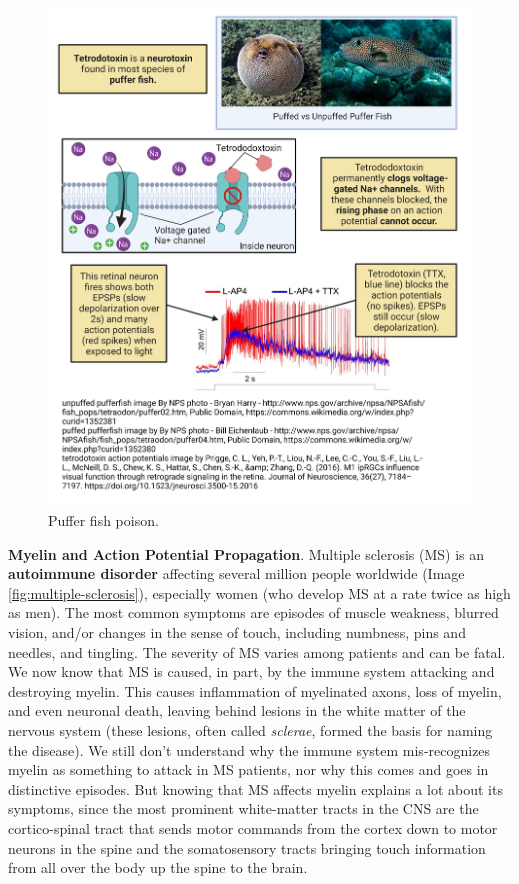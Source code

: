 \documentclass[
]{book}
\begin{document}
\begin{figure}

{\centering \includegraphics[width=0.9\linewidth]{images/ch02/02_30} 

}

\caption{Puffer fish poison.}\label{fig:puffer-fish-poison}
\end{figure}

\textbf{Myelin and Action Potential Propagation}. Multiple sclerosis (MS) is an \textbf{autoimmune disorder} affecting several million people worldwide (Image \ref{fig:multiple-sclerosis}), especially women (who develop MS at a rate twice as high as men). The most common symptoms are episodes of muscle weakness, blurred vision, and/or changes in the sense of touch, including numbness, pins and needles, and tingling. The severity of MS varies among patients and can be fatal. We now know that MS is caused, in part, by the immune system attacking and destroying myelin. This causes inflammation of myelinated axons, loss of myelin, and even neuronal death, leaving behind lesions in the white matter of the nervous system (these lesions, often called \emph{sclerae}, formed the basis for naming the disease). We still don't understand why the immune system mis-recognizes myelin as something to attack in MS patients, nor why this comes and goes in distinctive episodes. But knowing that MS affects myelin explains a lot about its symptoms, since the most prominent white-matter tracts in the CNS are the cortico-spinal tract that sends motor commands from the cortex down to motor neurons in the spine and the somatosensory tracts bringing touch information from all over the body up the spine to the brain.
\end{document}
